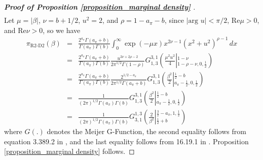 \documentclass[12pt]{article}
\begin{document}
\begin{proof} [\textbf{Proof of Proposition \ref{proposition_marginal density}} ]
\begin{eqnarray}
	\end{eqnarray}
	Let  $\mu = |\beta|$, $\nu=b+1/2$,  $u^2=2$, and $\rho = 1-a_\pi-b$,    since  $|\text{arg } u|<{\pi}/ {2}$, Re$\mu  >0$, and Re$\nu>0$,    so  we have
	\begin{eqnarray}
	\pi_{\text{R2-D2}}(\beta)
	&=& \frac{2^{a_\pi}\Gamma(a_\pi+b)}{\Gamma(a_\pi) \Gamma(b)}  \int_{  0}^\infty  \exp(- \mu x ) x^{2\nu-1} (x^2+u^2)^{\rho-1} \, dx  \nonumber\\
	&=& \frac{2^{a_\pi}\Gamma(a_\pi+b)}{\Gamma(a_\pi)\Gamma(b)} \frac{u^{2\nu+2\rho-2}}{2\pi^{1/2} \Gamma(1-\rho)}G^{3,1}_{1,3}\left( \frac{\mu^2 u^2}{4} \left\vert_{1-\rho-\nu,0,\frac{1}{2}}^{1-\nu}\right.
	\right) \nonumber     \\
	&=&  \frac{2^{a_\pi}\Gamma(a_\pi+b)}{\Gamma(a_\pi)\Gamma(b)} \frac{2^{1/2-a_\pi}}{2\pi^{1/2} \Gamma(a_\pi+b)}  G^{3,1}_{1,3}\left( \frac{\beta^2}{2} \left\vert_{a_\pi-\frac{1}{2},0,\frac{1}{2}}^{\frac{1}{2}-b}\right. 	\right)   \nonumber  \\
	&=&   \frac{1}{ (2\pi)^{1/2}\Gamma(a_\pi)\Gamma(b) }  G^{3,1}_{1,3}\left( \frac{\beta^2}{2} \left\vert_{a_\pi-\frac{1}{2},0,\frac{1}{2}}^{\frac{1}{2}-b}\right.   \right)  \nonumber \\
	&=& \frac{1}{ (2\pi)^{1/2}\Gamma(a_\pi)\Gamma(b) }   G^{1,3}_{3,1}\left( \frac{2}{\beta^2} \left\vert_{ \frac{1}{2}+b }^{\frac{3}{2} -  a_\pi,1,\frac{1}{2}}\right.
	\right)
	\nonumber
	\end{eqnarray}
	where $G(.)$ denotes the Meijer  G-Function,  the second equality   follows from equation 3.389.2 in \cite{zwillinger2014table},
	and the last  equality  follows from
	{16.19.1} in \cite{NISTDLMF}.
	Proposition \ref{proposition_marginal density}  follows.
\end{proof}
\end{document}
